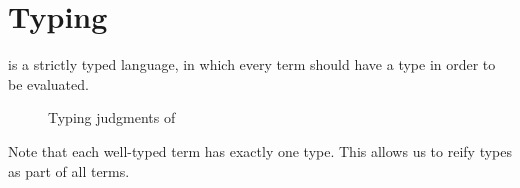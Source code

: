 \section{Typing}
\label{sec:typing}

\langname is a strictly typed language, in which every term should have a type in order to be evaluated.

\begin{figure}[h]
\footnotesize

\caption{Typing judgments of \langname}
\label{fig:typing}
\end{figure}

Note that each well-typed term has exactly one type. This allows us to reify
types as part of all terms.